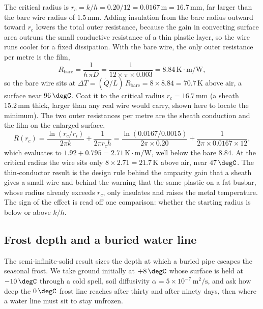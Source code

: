 The critical radius is $r_c = k/h = 0.20/12 = 0.0167\,\text{m} =
16.7\,\si{\milli\meter}$, far larger than the bare wire radius of
$1.5\,\si{\milli\meter}$. Adding insulation from the bare radius outward
toward $r_c$ lowers the total outer resistance, because the gain in
convecting surface area outruns the small conductive resistance of a thin
plastic layer, so the wire runs cooler for a fixed dissipation. With the
bare wire, the only outer resistance per metre is the film,
\[
R_{\text{bare}} = \frac{1}{h\,\pi D} = \frac{1}{12 \times \pi \times
0.003} = 8.84\,\si{\kelvin}\cdot\text{m}/\text{W},
\]
so the bare wire sits at $\Delta T = (\dot{Q}/L)\,R_{\text{bare}} = 8
\times 8.84 = 70.7\,\si{\kelvin}$ above air, a surface near $96\,\degC$.
Coat it to the critical radius $r_c = 16.7\,\si{\milli\meter}$ (a sheath
$15.2\,\si{\milli\meter}$ thick, larger than any real wire would carry,
shown here to locate the minimum). The two outer resistances per metre
are the sheath conduction and the film on the enlarged surface,
\[
R(r_c) = \frac{\ln(r_c/r_i)}{2\pi k} + \frac{1}{2\pi r_c h} =
\frac{\ln(0.0167/0.0015)}{2\pi \times 0.20} + \frac{1}{2\pi \times
0.0167 \times 12},
\]
which evaluates to $1.92 + 0.795 = 2.71\,\si{\kelvin}\cdot\text{m}/
\text{W}$, well below the bare $8.84$. At the critical radius the wire
sits only $8 \times 2.71 = 21.7\,\si{\kelvin}$ above air, near
$47\,\degC$. The thin-conductor result is the design rule behind the
ampacity gain that a sheath gives a small wire and behind the warning
that the same plastic on a fat busbar, whose radius already exceeds
$r_c$, only insulates and raises the metal temperature. The sign of the
effect is read off one comparison: whether the starting radius is below
or above $k/h$.

\subsection{Frost depth and a buried water line}

The semi-infinite-solid result sizes the depth at which a buried pipe
escapes the seasonal frost. We take ground initially at $+8\,\degC$ whose
surface is held at $-10\,\degC$ through a cold spell, soil diffusivity
$\alpha = 5 \times 10^{-7}\,\text{m}^2/\text{s}$, and ask how deep the
$0\,\degC$ frost line reaches after thirty and after ninety days, then
where a water line must sit to stay unfrozen.

